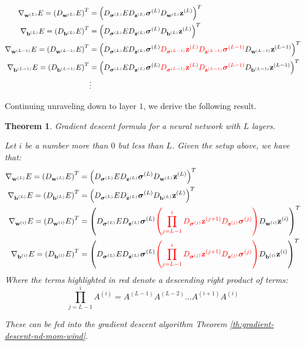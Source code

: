 \documentclass[a4paper]{article}
\theoremstyle{plain} %
\newtheorem{theorem}{Theorem}[section]
\theoremstyle{definition} %
\numberwithin{equation}{subsection}
\newcommand{\vz}{{\textbf{z}}}
\newcommand{\vw}{{\textbf{w}}}
\newcommand{\vb}{{\textbf{b}}}
\newcommand{\vsigma}{{\bm{\sigma}}} %
\begin{document}
\begin{align*}
  \nabla_{\vw^{(L)}}E = \left(D_{\vw^{(L)}}E\right)^T &= \left(D_{\vsigma^{(L)}}E D_{\vz^{(L)}}\vsigma^{(L)} D_{\vw^{(L)}}\vz^{(L)}\right)^T \\
  \nabla_{\vb^{(L)}}E = \left(D_{\vb^{(L)}}E\right)^T &= \left(D_{\vsigma^{(L)}}E D_{\vz^{(L)}}\vsigma^{(L)} D_{\vb^{(L)}}\vz^{(L)}\right)^T \\
  \nabla_{\vw^{(L-1)}}E = \left(D_{\vw^{(L-1)}}E\right)^T &= \left(D_{\vsigma^{(L)}}E D_{\vz^{(L)}}\vsigma^{(L)} 
  \textcolor{red}{D_{\vsigma^{(L-1)}}\vz^{(L)} D_{\vz^{(L-1)}} \vsigma^{(L-1)}}
  D_{\vw^{(L-1)}}\vz^{(L-1)}\right)^T \\
  \nabla_{\vb^{(L-1)}}E = \left(D_{\vb^{(L-1)}}E\right)^T &= \left(D_{\vsigma^{(L)}}E D_{\vz^{(L)}}\vsigma^{(L)} 
  \textcolor{red}{D_{\vsigma^{(L-1)}}\vz^{(L)} D_{\vz^{(L-1)}} \vsigma^{(L-1)}} 
  D_{\vb^{(L-1)}}\vz^{(L-1)}\right)^T  \\
   &\vdots
\end{align*}

Continuing unraveling down to layer $1$, we derive the following result.

\begin{theorem} \label{th:nn-L-layer}
  Gradient descent formula for a neural network with $L$ layers.

  Let $i$ be a number more than $0$ but less than $L$. Given the setup above, we have that:
\begin{align*}
  \nabla_{\vw^{(L)}}E = \left(D_{\vw^{(L)}}E\right)^T &= \left(D_{\vsigma^{(L)}}E D_{\vz^{(L)}}\vsigma^{(L)} D_{\vw^{(L)}}\vz^{(L)}\right)^T \\
  \nabla_{\vb^{(L)}}E = \left(D_{\vb^{(L)}}E\right)^T &= \left(D_{\vsigma^{(L)}}E D_{\vz^{(L)}}\vsigma^{(L)} D_{\vb^{(L)}}\vz^{(L)}\right)^T \\
  \nabla_{\vw^{(i)}}E = \left(D_{\vw^{(i)}}E\right)^T &= \left(D_{\vsigma^{(L)}}E D_{\vz^{(L)}}\vsigma^{(L)} 
  \textcolor{red}{
    \left(\prod_{j = L-1}^{i}D_{\vsigma^{(j)}}\vz^{(j+1)} D_{\vz^{(j)}} \vsigma^{(j)}\right)
    }
  D_{\vw^{(i)}}\vz^{(i)}\right)^T \\
  \nabla_{\vb^{(i)}}E = \left(D_{\vb^{(i)}}E\right)^T &= \left(D_{\vsigma^{(L)}}E D_{\vz^{(L)}}\vsigma^{(L)} 
  \textcolor{red}{
    \left(\prod_{j = L-1}^{i}D_{\vsigma^{(j)}}\vz^{(j+1)} D_{\vz^{(j)}} \vsigma^{(j)}\right)
    } 
  D_{\vb^{(i)}}\vz^{(i)}\right)^T 
\end{align*} 
  Where the terms highlighted in red denote a descending right product of terms:
  \[
  \prod_{j=L-1}^{i} A^{(i)} = A^{(L-1)}A^{(L-2)}\dots A^{(i+1)} A^{(i)}
  \]


  These can be fed into the gradient descent algorithm Theorem \ref{th:gradient-descent-nd-mom-wind}.
\end{theorem}
\end{document}
